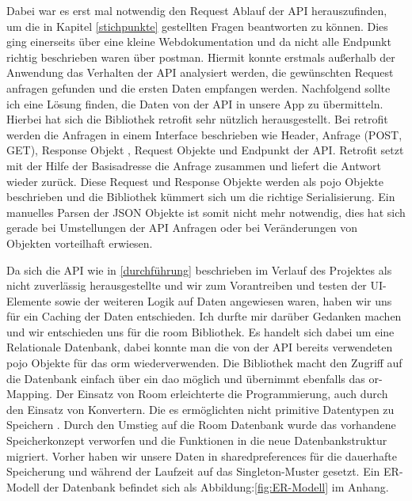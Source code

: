 Dabei war es erst mal notwendig den Request Ablauf der API herauszufinden, um die in Kapitel \ref{stichpunkte} gestellten Fragen beantworten zu können. Dies ging einerseits über eine kleine Webdokumentation und da nicht alle Endpunkt richtig beschrieben
 waren über \gls{postman}. Hiermit konnte erstmals außerhalb der Anwendung das Verhalten der API analysiert werden, die gewünschten Request anfragen gefunden und die ersten Daten empfangen werden. Nachfolgend sollte ich eine Lösung finden, die Daten von der API in unsere App zu übermitteln. Hierbei hat sich die Bibliothek \gls{retrofit} sehr nützlich herausgestellt. Bei \gls{retrofit} werden die Anfragen in einem Interface beschrieben wie Header, Anfrage (POST, GET), Response Objekt , Request
  Objekte und Endpunkt der API. Retrofit setzt mit der Hilfe der Basisadresse die Anfrage zusammen und liefert die Antwort wieder zurück. Diese Request und Response Objekte werden als \ac{pojo} Objekte beschrieben und die Bibliothek kümmert sich um die richtige Serialisierung. Ein manuelles Parsen der JSON Objekte ist somit nicht mehr notwendig, dies hat sich gerade bei Umstellungen der API Anfragen oder bei Veränderungen von Objekten vorteilhaft erwiesen.

Da sich die API wie in \ref{durchführung} beschrieben im Verlauf des Projektes als nicht zuverlässig herausgestellte  und wir zum Vorantreiben und testen der UI-Elemente sowie der weiteren Logik auf Daten angewiesen waren, haben wir uns für ein Caching der Daten entschieden. Ich durfte mir darüber Gedanken machen und wir entschieden uns für   die \gls{room} Bibliothek. Es handelt sich dabei um eine Relationale Datenbank, dabei konnte man die von der API bereits verwendeten \ac{pojo} Objekte für das \ac{orm} wiederverwenden. Die Bibliothek macht den Zugriff auf die Datenbank einfach über ein \ac{dao}  möglich und übernimmt ebenfalls das \ac{or}-Mapping. Der Einsatz von Room erleichterte die Programmierung, auch durch den Einsatz von Konvertern. Die es ermöglichten nicht primitive Datentypen zu Speichern . 
Durch den Umstieg auf die Room Datenbank wurde das vorhandene Speicherkonzept verworfen und die Funktionen in die neue Datenbankstruktur migriert.
Vorher haben wir unsere Daten in \gls{sharedpreferences} für die dauerhafte Speicherung und während der Laufzeit auf das Singleton-Muster gesetzt.
Ein ER-Modell der Datenbank befindet sich  als Abbildung:\ref{fig:ER-Modell}  im Anhang.

